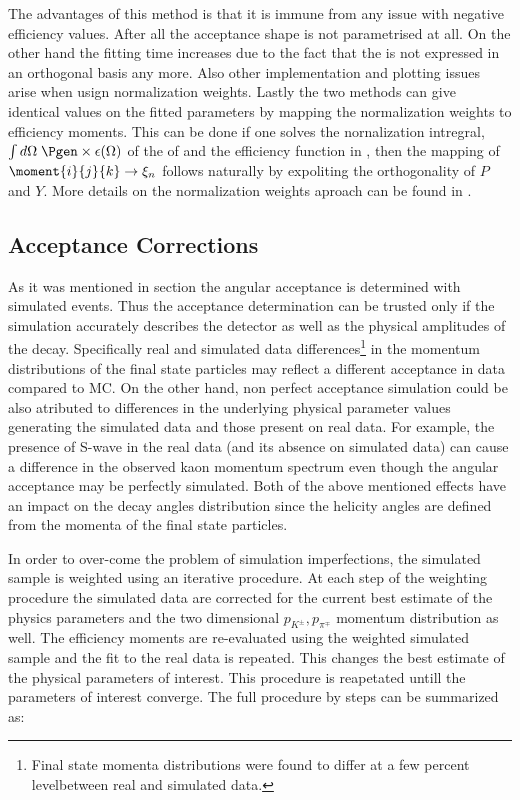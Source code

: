 The advantages of this method is that it is immune from any issue with negative efficiency values. After all the acceptance shape is not parametrised at all.
On the other hand the fitting time increases due to the fact that the \pdf is not expressed in an orthogonal basis any more. Also other
implementation and plotting issues arise when usign normalization weights. Lastly the two methods can give identical values on the fitted parameters by mapping 
the normalization weights to efficiency moments. This can be done if one solves the nornalization intregral, $\int d\Omega\;\Pgen\times\epsilon(\Omega)$
of the \pdf of  and the efficiency function in , then the mapping of $\moment{i}{j}{k} \rightarrow \xi_n$ follows naturally
by expoliting the orthogonality of $P$ and $Y$. More details on the normalization weights aproach can be found in \cite{jeroenThesis}. 

\subsection{Acceptance Corrections}
\label{Accceptance_Corrections}
As it was mentioned in section  the angular acceptance is determined with simulated \BsJpsiKst events.
Thus the acceptance determination can be trusted only if the simulation accurately describes the detector as well as the 
physical amplitudes of the \BsJpsiKst decay. Specifically real and simulated data differences\footnote{Final state momenta distributions were found to differ at a few 
percent levelbetween real and simulated data.} in the momentum distributions
of the final state particles  may reflect a different acceptance in data compared to MC. On the other hand,
non perfect acceptance simulation could be also atributed to differences in the underlying physical parameter values generating 
the simulated data and those present on real data. For example, the presence of S-wave in the real data (and its absence on simulated data)
can cause a difference in the observed kaon momentum spectrum even though the angular acceptance may be perfectly simulated.
Both of the above mentioned effects have an impact on the decay angles distribution since the helicity angles are defined
from the momenta of the final state particles. 

In order to over-come the problem of simulation imperfections, the simulated sample is weighted using an iterative procedure. 
At each step of the weighting procedure the simulated data are corrected for the current best estimate of the physics 
parameters and the two dimensional $p_{K^{\pm}},p_{\pi^{\mp}}$ momentum distribution as well. 
The efficiency moments are re-evaluated using the weighted simulated sample and the fit to the real data is repeated. 
This changes the best estimate of the physical parameters of interest. This procedure is reapetated untill the parameters
of interest converge. The full procedure by steps can be summarized as:

